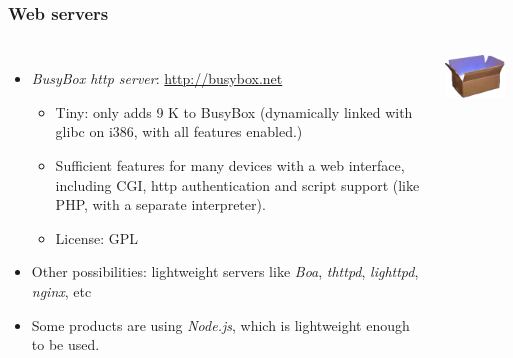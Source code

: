\begin{frame}
  \frametitle{Web servers}
  \begin{columns}
    \begin{itemize}
    \item {\em BusyBox http server}: \url{http://busybox.net}
      \begin{itemize}
      \item Tiny: only adds 9 K to BusyBox (dynamically linked with
        glibc on i386, with all features enabled.)
      \item Sufficient features for many devices with a web interface,
        including CGI, http authentication and script support (like
        PHP, with a separate interpreter).
      \item License: GPL
      \end{itemize}
    \item Other possibilities: lightweight servers like {\em Boa},
          {\em thttpd}, {\em lighttpd}, {\em nginx}, etc
    \item Some products are using {\em Node.js}, which is lightweight
          enough to be used.
    \end{itemize}
    \includegraphics[width=0.9\textwidth]{slides/sysdev-embedded-linux/busybox.png}\\

\end{columns}
\end{frame}
